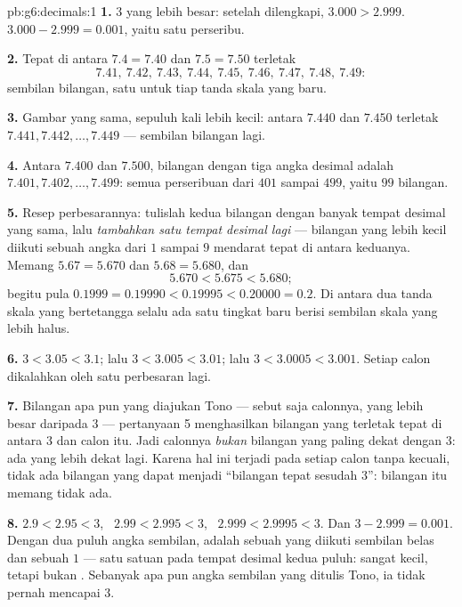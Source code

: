\begin{solution}{pb:g6:decimals:1}
\textbf{1.} $3$ yang lebih besar: setelah dilengkapi, $3.000 > 2.999$.
 $3.000 - 2.999 = 0.001$, yaitu satu perseribu.

\textbf{2.} Tepat di antara $7.4 = 7.40$ dan $7.5 = 7.50$ terletak
\[
7.41,\ 7.42,\ 7.43,\ 7.44,\ 7.45,\ 7.46,\ 7.47,\ 7.48,\ 7.49 :
\]
sembilan bilangan, satu untuk tiap tanda skala yang baru.

\textbf{3.} Gambar yang sama, sepuluh kali lebih kecil: antara $7.440$
dan $7.450$ terletak $7.441, 7.442, \dots, 7.449$ --- sembilan
bilangan lagi.

\textbf{4.} Antara $7.400$ dan $7.500$, bilangan dengan tiga angka
desimal adalah $7.401, 7.402, \dots, 7.499$: semua perseribuan dari
$401$ sampai $499$, yaitu $99$ bilangan.

\textbf{5.} Resep perbesarannya: tulislah kedua bilangan dengan
banyak tempat desimal yang sama, lalu \emph{tambahkan satu tempat
desimal lagi} --- bilangan yang lebih kecil diikuti sebuah angka dari
$1$ sampai $9$ mendarat tepat di antara keduanya. Memang
$5.67 = 5.670$ dan $5.68 = 5.680$, dan
\[
5.670 < 5.675 < 5.680 ;
\]
begitu pula $0.1999 = 0.19990 < 0.19995 < 0.20000 = 0.2$. Di antara
dua tanda skala yang bertetangga selalu ada satu tingkat baru berisi
sembilan skala yang lebih halus.

\textbf{6.} $3 < 3.05 < 3.1$; lalu $3 < 3.005 < 3.01$; lalu
$3 < 3.0005 < 3.001$. Setiap calon dikalahkan oleh satu perbesaran lagi.

\textbf{7.} Bilangan apa pun yang diajukan Tono --- sebut saja
calonnya, yang lebih besar daripada $3$ --- pertanyaan 5
menghasilkan bilangan yang terletak tepat di antara $3$ dan calon
itu. Jadi calonnya \emph{bukan} bilangan yang paling dekat dengan
$3$: ada yang lebih dekat lagi. Karena hal ini terjadi pada setiap
calon tanpa kecuali, tidak ada bilangan yang dapat menjadi
``bilangan tepat sesudah $3$'': bilangan itu memang tidak ada.

\textbf{8.} $2.9 < 2.95 < 3$, \ $2.99 < 2.995 < 3$, \
$2.999 < 2.9995 < 3$. Dan $3 - 2.999 = 0.001$. Dengan dua puluh
angka sembilan,  adalah sebuah  yang diikuti
sembilan belas  dan sebuah $1$ --- satu satuan pada tempat desimal
kedua puluh: sangat kecil, tetapi bukan \omterm{def:g1:counting:zero}{nol}. Sebanyak apa pun angka
sembilan yang ditulis Tono, ia tidak pernah mencapai $3$.


\end{solution}

